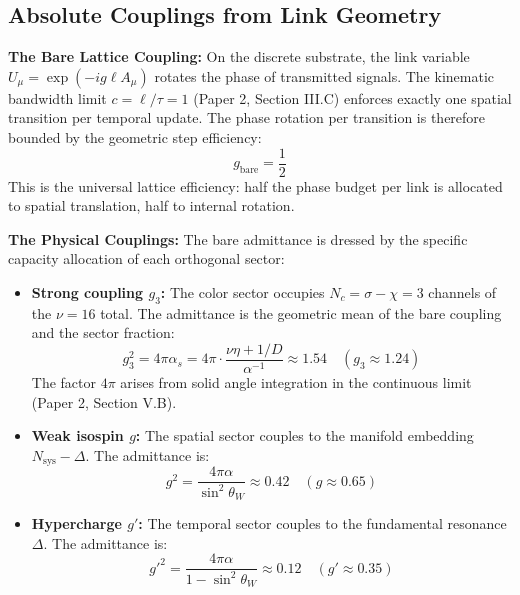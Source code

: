 \subsection{Absolute Couplings from Link Geometry}

\textbf{The Bare Lattice Coupling:} On the discrete substrate, the link variable $U_\mu = \exp(-ig \ell A_\mu)$ rotates the phase of transmitted signals. The kinematic bandwidth limit $c = \ell/\tau = 1$ (Paper 2, Section III.C) enforces exactly one spatial transition per temporal update. The phase rotation per transition is therefore bounded by the geometric step efficiency:
\begin{equation}
    g_{\text{bare}} = \frac{1}{2}
\end{equation}
This is the universal lattice efficiency: half the phase budget per link is allocated to spatial translation, half to internal rotation.

\textbf{The Physical Couplings:} The bare admittance is dressed by the specific capacity allocation of each orthogonal sector:

\begin{itemize}
    \item \textbf{Strong coupling $g_3$:} The color sector occupies $N_c = \sigma - \chi = 3$ channels of the $\nu = 16$ total. The admittance is the geometric mean of the bare coupling and the sector fraction:
    \begin{equation}
        g_3^2 = 4\pi \alpha_s = 4\pi \cdot \frac{\nu\eta + 1/D}{\alpha^{-1}}
        \approx 1.54 \quad (g_3 \approx 1.24)
    \end{equation}
    The factor $4\pi$ arises from solid angle integration in the continuous limit (Paper 2, Section V.B).
    
    \item \textbf{Weak isospin $g$:} The spatial sector couples to the manifold embedding $N_{\text{sys}} - \Delta$. The admittance is:
    \begin{equation}
        g^2 = \frac{4\pi\alpha}{\sin^2\theta_W} \approx 0.42 \quad (g \approx 0.65)
    \end{equation}
    
    \item \textbf{Hypercharge $g'$:} The temporal sector couples to the fundamental resonance $\Delta$. The admittance is:
    \begin{equation}
        g'^2 = \frac{4\pi\alpha}{1-\sin^2\theta_W} \approx 0.12 \quad (g' \approx 0.35)
    \end{equation}
\end{itemize}


